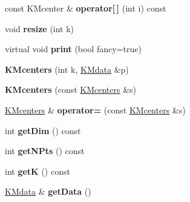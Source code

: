\begin{DoxyCompactItemize}
\item 
\hypertarget{class_k_mcenters_a395c5699c4da5690e1421a55327b6253}{
const KMcenter \& {\bfseries operator\mbox{[}$\,$\mbox{]}} (int i) const }
\label{class_k_mcenters_a395c5699c4da5690e1421a55327b6253}

\item 
\hypertarget{class_k_mcenters_ac9fe3a5aac9dcdf647a2b3116bd9d3db}{
void {\bfseries resize} (int k)}
\label{class_k_mcenters_ac9fe3a5aac9dcdf647a2b3116bd9d3db}

\item 
\hypertarget{class_k_mcenters_ac52ba80230434cd440f9819f2c6cc030}{
virtual void {\bfseries print} (bool fancy=true)}
\label{class_k_mcenters_ac52ba80230434cd440f9819f2c6cc030}

\item 
\hypertarget{class_k_mcenters_a3c66312b8fd1c4d74456993334f213f8}{
{\bfseries KMcenters} (int k, \hyperlink{class_k_mdata}{KMdata} \&p)}
\label{class_k_mcenters_a3c66312b8fd1c4d74456993334f213f8}

\item 
\hypertarget{class_k_mcenters_a2e7882a22e4ba5169876699583699728}{
{\bfseries KMcenters} (const \hyperlink{class_k_mcenters}{KMcenters} \&s)}
\label{class_k_mcenters_a2e7882a22e4ba5169876699583699728}

\item 
\hypertarget{class_k_mcenters_a11aaa43d8647052b4698f16630742fed}{
\hyperlink{class_k_mcenters}{KMcenters} \& {\bfseries operator=} (const \hyperlink{class_k_mcenters}{KMcenters} \&s)}
\label{class_k_mcenters_a11aaa43d8647052b4698f16630742fed}

\item 
\hypertarget{class_k_mcenters_a8bb9b4e6d673042aac5f73c8f5169a17}{
int {\bfseries getDim} () const }
\label{class_k_mcenters_a8bb9b4e6d673042aac5f73c8f5169a17}

\item 
\hypertarget{class_k_mcenters_a885153552ea70f53d00fc5d3982615a8}{
int {\bfseries getNPts} () const }
\label{class_k_mcenters_a885153552ea70f53d00fc5d3982615a8}

\item 
\hypertarget{class_k_mcenters_af0f0d1000eabdfa259f754aa458e202c}{
int {\bfseries getK} () const }
\label{class_k_mcenters_af0f0d1000eabdfa259f754aa458e202c}

\item 
\hypertarget{class_k_mcenters_afb15eb018d4c55f30ea6ac4c275ca344}{
\hyperlink{class_k_mdata}{KMdata} \& {\bfseries getData} ()}
\label{class_k_mcenters_afb15eb018d4c55f30ea6ac4c275ca344}


\end{DoxyCompactItemize}
